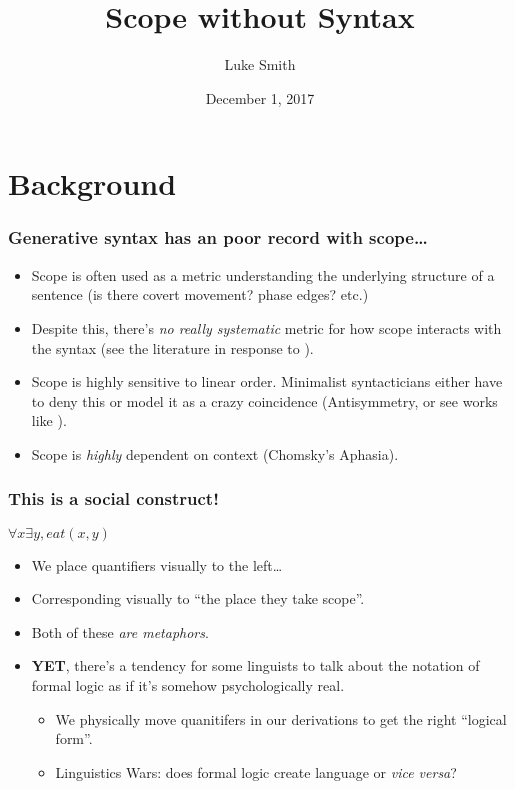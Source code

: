\documentclass[aspectratio=169]{beamer}
\title{Scope without Syntax}
\author{Luke Smith}
\date{December 1, 2017}
\institute{University of Arizona}
\begin{document}
\begin{frame}

\maketitle

\end{frame}
\section{Background}

\begin{frame}
\frametitle{Generative syntax has an poor record with scope\ldots}\pause

	\begin{itemize}
		\item Scope is often used as a metric understanding the underlying structure of a sentence (is there covert movement? phase edges? etc.)\pause
		\item Despite this, there's \emph{no really systematic} metric for how scope interacts with the syntax (see the literature in response to \textcite{han07}).\pause
		\item Scope is highly sensitive to linear order. Minimalist syntacticians either have to deny this or model it as a crazy coincidence (Antisymmetry, or see works like \textcite{collins17}).\pause
		\item Scope is \emph{highly} dependent on context (Chomsky's Aphasia).
	\end{itemize}
\end{frame}

\begin{frame}
	\frametitle{This is a social construct!}
			\begin{center}${\forall}x{\exists}y, eat(x,y)$\end{center}\pause
	\begin{itemize}
		\item We place quantifiers visually to the left\ldots\pause
		\item Corresponding visually to ``the place they take scope''.\pause
		\item Both of these \emph{are metaphors}.\pause
		\item \textbf{YET}, there's a tendency for some linguists to talk about the notation of formal logic as if it's somehow psychologically real.\pause
			\begin{itemize}
				\item We physically move quanitifers in our derivations to get the right ``logical form''.\pause
				\item Linguistics Wars: does formal logic create language or \textit{vice versa}?
			\end{itemize}
\end{itemize}
\end{frame}
\end{document}
